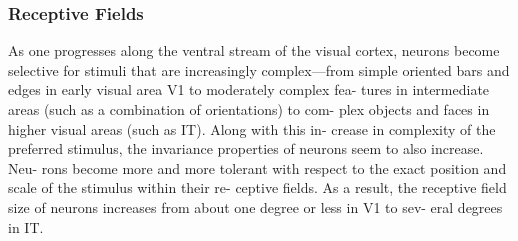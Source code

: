 \subsubsection{Receptive Fields}
As one progresses along the ventral stream of the visual cortex, neurons
become selective for stimuli that are
increasingly complex—from simple
oriented bars and edges in early visual
area V1 to moderately complex fea-
tures in intermediate areas (such as a
combination of orientations) to com-
plex objects and faces in higher visual
areas (such as IT). Along with this in-
crease in complexity of the preferred
stimulus, the invariance properties of
neurons seem to also increase. Neu-
rons become more and more tolerant
with respect to the exact position and
scale of the stimulus within their re-
ceptive fields. As a result, the receptive
field size of neurons increases from
about one degree or less in V1 to sev-
eral degrees in IT.


